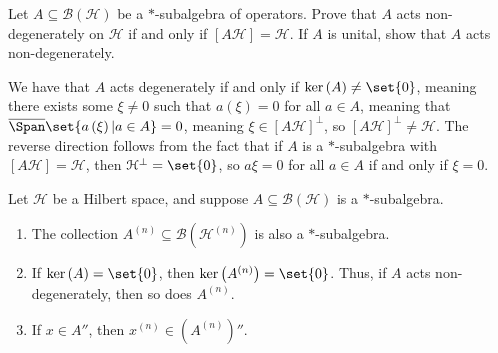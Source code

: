 \documentclass[10pt]{mypackage}
\begin{document}
\begin{exercise}
  Let $A\subseteq \mathcal{B}\left(\mathcal{H}\right)$ be a $\ast$-subalgebra of operators. Prove that $A$ acts non-degenerately on $\mathcal{H}$ if and only if $\left[A \mathcal{H}\right] = \mathcal{H}$. If $A$ is unital, show that $A$ acts non-degenerately.
\end{exercise}
\begin{solution}
  We have that $A$ acts degenerately if and only if $\ker\left(A\right)\neq \set{0}$, meaning there exists some $\xi\neq 0$ such that $a\left(\xi\right) = 0$ for all $a\in A$, meaning that $\overline{\Span}\set{a\left(\xi\right) | a\in A} = 0$, meaning $\xi\in \left[A\mathcal{H}\right]^{\perp}$, so $\left[A\mathcal{H}\right]^{\perp}\neq \mathcal{H}$. The reverse direction follows from the fact that if $A$ is a $\ast$-subalgebra with $\left[A\mathcal{H}\right] = \mathcal{H}$, then $\mathcal{H}^{\perp} = \set{0}$, so $a\xi = 0$ for all $a\in A$ if and only if $\xi = 0$.
\end{solution}
\begin{lemma}
  Let $\mathcal{H}$ be a Hilbert space, and suppose $A\subseteq \mathcal{B}\left(\mathcal{H}\right)$ is a $\ast$-subalgebra.
  \begin{enumerate}[(1)]
    \item The collection $A^{(n)}\subseteq \mathcal{B}\left(\mathcal{H}^{(n)}\right)$ is also a $\ast$-subalgebra.
    \item If $\ker\left(A\right) = \set{0}$, then $\ker\left(A^{(n)}\right) = \set{0}$. Thus, if $A$ acts non-degenerately, then so does $A^{(n)}$.
    \item If $x\in A''$, then $x^{(n)}\in \left(A^{(n)}\right)''$.
  \end{enumerate}
\end{lemma}
\end{document}

